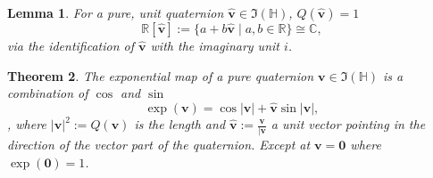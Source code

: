 \documentclass{amsart}
\newtheorem{theorem}{Theorem}[section]
\newtheorem{lemma}[theorem]{Lemma}
\theoremstyle{definition}
\theoremstyle{remark}
\numberwithin{equation}{section}
\begin{document}
\begin{lemma}
  For a pure, unit quaternion $\mathbf{\hat{v}}\in\Im(\mathbb{H})$, $Q(\mathbf{\hat{v}})=1$
  \begin{equation}
    \mathbb{R}[\mathbf{\hat{v}}] := \{a+b\mathbf{\hat{v}} \mid a,b \in\mathbb{R}\} \cong \mathbb{C},
  \end{equation}
  via the identification of $\hat{\mathbf{v}}$ with the imaginary unit $i$.
\end{lemma}

\begin{theorem}
  The exponential map of a pure quaternion $\mathbf{v}\in\Im(\mathbb{H})$ is a combination of $\cos$ and $\sin$
  \begin{equation}
    \exp(\mathbf{v}) = \cos|\mathbf{v}| + \mathbf{\hat{v}} \sin|\mathbf{v}|,
  \end{equation},
  where $|\mathbf{v}|^2:=Q(\mathbf{v})$ is the length and $\mathbf{\hat{v}}:=\frac{\mathbf{v}}{|\mathbf{v}}$ a unit vector pointing in the direction of the vector part of the quaternion.
  Except at $\mathbf{v}=\mathbf{0}$ where $\exp(\mathbf{0}) = 1$.
\end{theorem}
\end{document}
